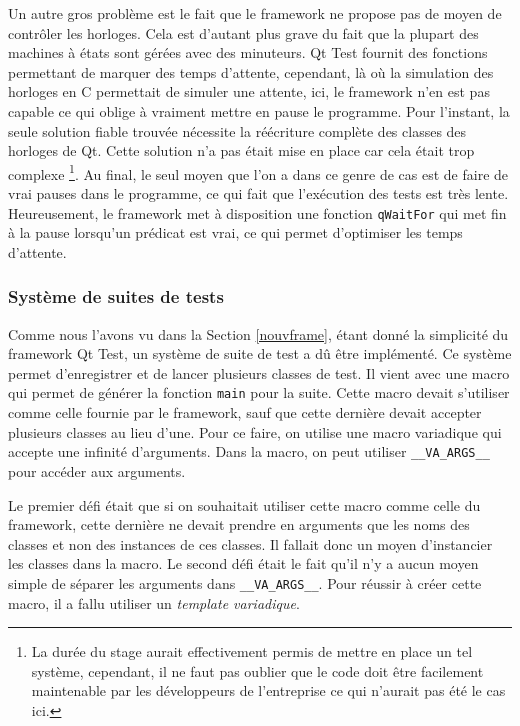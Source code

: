 \documentclass[a4paper]{article}
\begin{document}
Un autre gros problème est le fait que le framework ne propose pas de moyen de
contrôler les horloges. Cela est d'autant plus grave du fait que la plupart des
machines à états sont gérées avec des minuteurs. Qt Test fournit des fonctions
permettant de marquer des temps d'attente, cependant, là où la simulation des
horloges en C permettait de simuler une attente, ici, le framework n'en est pas
capable ce qui oblige à vraiment mettre en pause le programme. Pour l'instant,
la seule solution fiable trouvée nécessite la réécriture complète des classes
des horloges de Qt. Cette solution n'a pas était mise en place car cela était
trop complexe \footnote{La durée du stage aurait effectivement permis de mettre
en place un tel système, cependant, il ne faut pas oublier que le code doit être
facilement maintenable par les développeurs de l'entreprise ce qui n'aurait pas
été le cas ici.}. Au final, le seul moyen que l'on a dans ce genre de cas est de
faire de vrai pauses dans le programme, ce qui fait que l'exécution des tests
est très lente. Heureusement, le framework met à disposition une fonction
\verb|qWaitFor| qui met fin à la pause lorsqu'un prédicat est vrai, ce qui
permet d'optimiser les temps d'attente.

\subsubsection*{Système de suites de tests}

Comme nous l'avons vu dans la Section \ref{nouvframe}, étant donné la simplicité
du framework Qt Test, un système de suite de test a dû être implémenté. Ce
système permet d'enregistrer et de lancer plusieurs classes de test. Il vient
avec une macro qui permet de générer la fonction \verb|main| pour la suite.
Cette macro devait s'utiliser comme celle fournie par le framework, sauf que
cette dernière devait accepter plusieurs classes au lieu d'une. Pour ce faire, on
utilise une macro variadique qui accepte une infinité d'arguments. Dans la
macro, on peut utiliser \verb|__VA_ARGS__| pour accéder aux arguments.

Le premier défi était que si on souhaitait utiliser cette macro comme celle du
framework, cette dernière ne devait prendre en arguments que les noms des
classes et non des instances de ces classes. Il fallait donc un moyen
d'instancier les classes dans la macro. Le second défi était le fait qu'il n'y a
aucun moyen simple de séparer les arguments dans \verb|__VA_ARGS__|. Pour
réussir à créer cette macro, il a fallu utiliser un \textit{template
variadique}.
\end{document}
